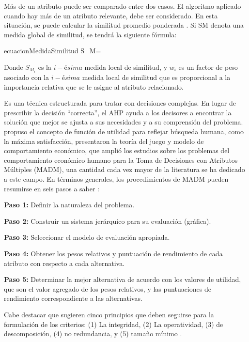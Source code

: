 Más de un atributo puede ser comparado entre dos casos. El algoritmo aplicado cuando hay más de un atributo relevante, debe ser considerado. En esta situación, se puede calcular la similitud promedio ponderada \cite[]{pal2004foundations}. Si SM denota una medida global de similitud, se tendrá la siguiente fórmula:
\begin{ecuacion}{ecuacionMedidaSimilitud}
	{S}_{M}=
\end{ecuacion}
Donde $S_{M_{i}}$ es la $i-ésima$ medida local de similitud, y $w_{i}$ es un factor de peso asociado con la $i-ésima$ medida local de similitud que es proporcional a la importancia relativa que se le asigne al atributo relacionado.

Es una técnica estructurada para tratar con decisiones complejas. En lugar de prescribir la decisión “correcta”, el AHP ayuda a los decisores a encontrar la solución que mejor se ajusta a sus necesidades y a su comprensión del problema. \citet{bernoulli1783sammlung} propuso el concepto de función de utilidad para reflejar búsqueda humana, como la máxima satisfacción, \citet{neumann1947theory}  presentaron la teoría del juego y modelo de comportamiento económico, que amplió los estudios sobre los  problemas del  comportamiento económico humano para la Toma de Decisiones con Atributos Múltiples (MADM), una cantidad cada vez mayor de la literatura se ha dedicado a este campo. En términos generales, los procedimientos de MADM pueden resumirse en seis pasos a saber \cite[]{dubois1980systems}:
\begin{viñetas}
\item \textbf{Paso 1:} Definir la naturaleza del problema.
\item \textbf{Paso 2:} Construir un sistema jerárquico para su evaluación (gráfica). 
\item \textbf{Paso 3:} Seleccionar el modelo de evaluación apropiada.
\item \textbf{Paso 4:} Obtener los pesos relativos y puntuación de rendimiento de cada atributo con respecto a cada alternativa.
\item \textbf{Paso 5:} Determinar la mejor alternativa de acuerdo con los valores de utilidad, que son el valor agregado de los pesos relativos, y las puntuaciones de rendimiento correspondiente a las alternativas.
\\
\end{viñetas}
Cabe destacar que \citet{keeney1976decision} sugieren cinco principios que deben seguirse para la formulación de los criterios: 
(1) La integridad, (2) La operatividad, (3) de descomposición, (4) no redundancia, y (5) tamaño mínimo .
